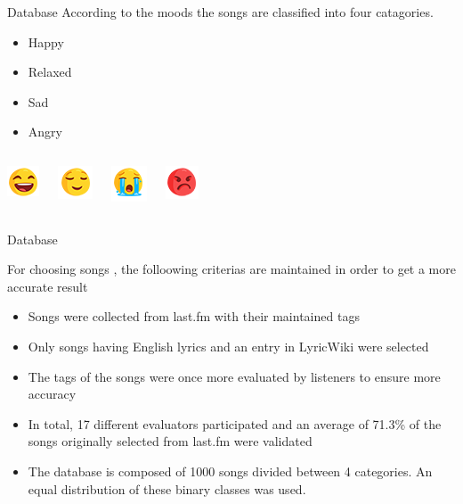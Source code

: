 \documentclass{beamer}
\begin{document}
\begin{frame}{Database}
According to the moods the songs are classified into four catagories.


	\begin{itemize}
	  \item {
		Happy
	  } 
	  \item<2-> {
		Relaxed
	  } 
	  \item<3-> {
		Sad
	  } 
	  \item<4-> {
		Angry
	  }
	  
	\end{itemize}

	
	\begin{columns}
	\includegraphics{happy}
	\pause
	


	\includegraphics{relaxed}
	\pause


	\includegraphics{sad}
	\pause


	\includegraphics{angry}
	\pause
  	\end{columns}
\end{frame}

\begin{frame}{Database}

For choosing songs , the folloowing criterias are maintained in order to get a more accurate result

	\begin{itemize}
	\item
	{
		Songs were collected from last.fm with their maintained tags
	} \pause
	\item
	{
		Only songs having English lyrics and an entry in LyricWiki were selected 
	} \pause
	\item
	{
		The tags of the songs were once more evaluated by listeners to ensure more accuracy
	} \pause
	\item
	{
		In total, 17 different evaluators participated and an average of 71.3\% of the songs originally selected from last.fm were validated
	} \pause
	\item
	{
		The database is composed of 1000 songs divided between 4 categories. An equal distribution of these binary classes was used.
	}
	\end{itemize}

\end{frame}
\end{document}
